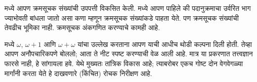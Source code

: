 \documentclass[../../../include/open-logic-section]{subfiles}
\begin{document}


 मध्ये आपण क्रमसूचक संख्यांची उपपत्ती विकसित केली.  मध्ये आपण पाहिले की पदानुक्रमाचा उर्वरित भाग ज्याभोवती बांधला जातो असा कणा म्हणून क्रमसूचक संख्यांकडे पाहता येते. पण क्रमसूचक संख्यांची तेवढीच भूमिका नाही. क्रमसूचक अंकगणित करण्याचे कामही आहे.

 मध्ये $\omega$, $\omega+1$ आणि $\omega+\omega$ यांचा उल्लेख करताना आपण याची आधीच थोडी कल्पना दिली होती. तेव्हा आपण अनौपचारिकपणे बोललो; आता ते नीट स्पष्ट करण्याची वेळ आली आहे. मात्र या प्रकरणात तत्त्वज्ञान फारसे नाही, हे सांगायला हवे. येथे मुख्यतः तांत्रिक विकास आहे; त्याबरोबर एकच गोष्ट दोन वेगवेगळ्या मार्गांनी करता येते हे दाखवणारे (किंचित) रोचक निरीक्षण आहे.
\end{document}
